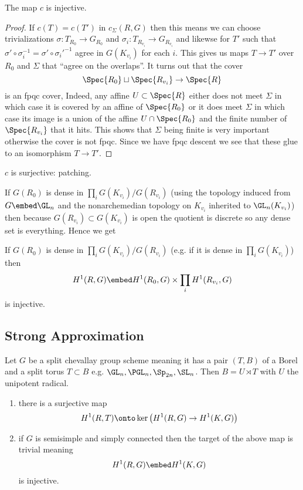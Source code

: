 \documentclass{article}
\begin{document}
\begin{lemma}
The map $c$ is injective.
\end{lemma}

\begin{proof}
If $c(T) = c(T')$ in $c_{\Sigma}(R, G)$ then this means we can choose trivializations $\sigma : T_{R_0} \to G_{R_0}$ and $\sigma_i : T_{R_{v_i}} \to G_{R_{v_i}}$ and likewse for $T'$ such that $\sigma' \circ \sigma^{-1}_i = \sigma' \circ \sigma_i'^{-1}$ agree in $G(K_{v_i})$ for each $i$. This gives us maps $T \to T'$ over $R_0$ and $\Sigma$ that ``agree on the overlaps''. It turns out that the cover 
\[ \Spec{R_0} \sqcup \Spec{R_{v_i}} \to \Spec{R} \]
is an fpqc cover, Indeed, any affine $U \subset \Spec{R}$ either does not meet $\Sigma$ in which case it is covered by an affine of $\Spec{R_0}$ or it does meet $\Sigma$ in which case its image is a union of the affine $U \cap \Spec{R_0}$ and the finite number of $\Spec{R_{v_i}}$ that it hits. This shows that $\Sigma$ being finite is very important otherwise the cover is not fpqc. Since we have fpqc descent we see that these glue to an isomorphism $T \to T'$.
\end{proof}

\begin{theorem}
$c$ is surjective: patching. 
\end{theorem}

If $G(R_0)$ is dense in $\prod_i G(K_{v_i}) / G(R_{v_i})$ (using the topology induced from $G \embed \GL_n$ and the nonarchemedian topology on $K_{v_i}$ inherited to $\GL_n(K_{v_i})$) then because $G(R_{v_i}) \subset G(K_{v_i})$ is open the quotient is discrete so any dense set is everything. Hence we get

\begin{cor}
If $G(R_0)$ is dense in  $\prod_i G(K_{v_i}) / G(R_{v_i})$ (e.g. if it is dense in $\prod_i G(K_{v_i})$) then 
\[  H^1(R, G) \embed H^1(R_0, G) \times \prod_i H^1(R_{v_i}, G) \]
is injective.
\end{cor}

\subsection{Strong Approximation}


\begin{prop}
Let $G$ be a split chevallay group scheme meaning it has a pair $(T, B)$ of a Borel and a split torus $T \subset B$ e.g. $\GL_n, \PGL_n, \Sp_{2n}, \SL_n$. Then $B = U \rtimes T$ with $U$ the unipotent radical.
\begin{enumerate}
\item there is a surjective map
\[ H^1(R, T) \onto \ker{ \left( H^1(R,G) \to H^1(K, G) \right) } \]

\item if $G$ is semisimple and simply connected then the target of the above map is trivial meaning
\[  H^1(R,G) \embed H^1(K, G) \]
is injective.
\end{enumerate}
\end{prop}
\end{document}
